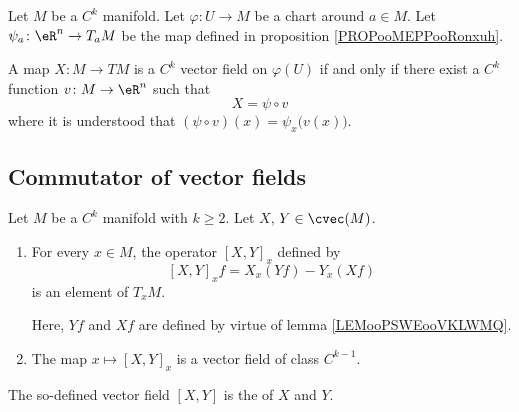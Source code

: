 \noproof


\begin{lemma}       \label{LEMooPWMUooRalWxC}
	Let \( M\) be a \( C^k\) manifold. Let \( \varphi\colon U\to M\) be a chart around \( a\in M\). Let \( \psi_a\colon \eR^n\to T_aM \) be the map defined in proposition \ref{PROPooMEPPooRonxuh}.

	A map \( X\colon M\to TM\) is a \( C^k\) vector field on \( \varphi(U)\) if and only if there exist a \( C^k\) function \( v\colon M\to \eR^n\) such that
	\begin{equation}
		X=\psi\circ v
	\end{equation}
	where it is understood that \( (\psi\circ v)(x)=\psi_x\big( v(x) \big)\).
\end{lemma}

\subsection{Commutator of vector fields}


\begin{propositionDef}      \label{DEFooHOTOooRaPwyo}
	Let \( M\) be a \( C^k\) manifold with \( k\geq 2\). Let $X$, $Y\in\cvec(M)$.
	\begin{enumerate}
		\item       \label{ITEMooZKKUooQjYftU}
		      For every \( x\in M\), the operator \( [X,Y]_x\) defined by
		      \begin{equation}        \label{EQooDSKWooXdjPPP}
			      [X,Y]_xf=X_x(Yf)-Y_x(Xf)
		      \end{equation}
		      is an element of \( T_xM\).

		      Here, \( Yf\) and \( Xf\) are defined by virtue of lemma \ref{LEMooPSWEooVKLWMQ}.
		\item       \label{ITEMooPGPLooQrKxWY}
		      The map \( x\mapsto [X,Y]_x\) is a vector field of class \( C^{k-1}\).
	\end{enumerate}

	The so-defined vector field \( [X,Y]\) is the  of \( X\) and \( Y\).
\end{propositionDef}


